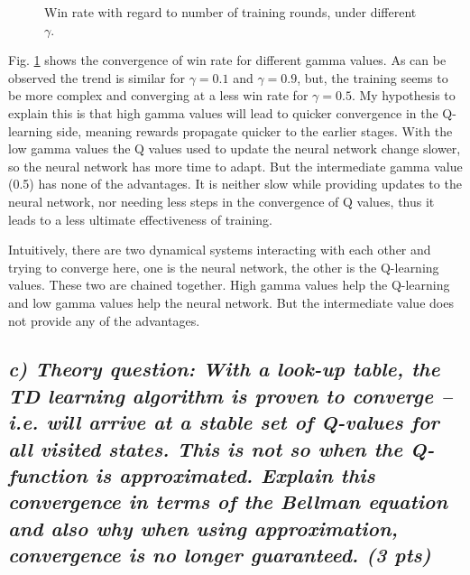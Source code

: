 \documentclass[a4paper,12pt]{article}
\begin{document}
\begin{figure}[hbt!]
\caption{Win rate with regard to number of training rounds, under different $\gamma$.}
\label{fig:win_rate_gamma}

\end{figure}
Fig. \ref{fig:win_rate_gamma} shows the convergence of win rate for different gamma values. As can be observed the trend is similar for $\gamma = 0.1$ and $\gamma = 0.9$, but, the training seems to be more complex and converging at a less win rate for $\gamma = 0.5$. My hypothesis to explain this is that high gamma values will lead to quicker convergence in the Q-learning side, meaning rewards propagate quicker to the earlier stages. With the low gamma values the Q values used to update the neural network change slower, so the neural network has more time to adapt. But the intermediate gamma value (0.5) has none of the advantages. It is neither slow while providing updates to the neural network, nor needing less steps in the convergence of Q values, thus it leads to a less ultimate effectiveness of training. 

Intuitively, there are two dynamical systems interacting with each other and trying to converge here, one is the neural network, the other is the Q-learning values. These two are chained together. High gamma values help the Q-learning and low gamma values help the neural network. But the intermediate value does not provide any of the advantages. 

\pagebreak
\subsection*{\emph{c) Theory question: With a look-up table, the TD learning algorithm is proven to converge – i.e. will arrive at a stable set of Q-values for all visited states. This is not so when the Q-function is approximated. Explain this convergence in terms of the Bellman equation and also why when using approximation, convergence is no longer guaranteed. (3 pts)}}
\end{document}
